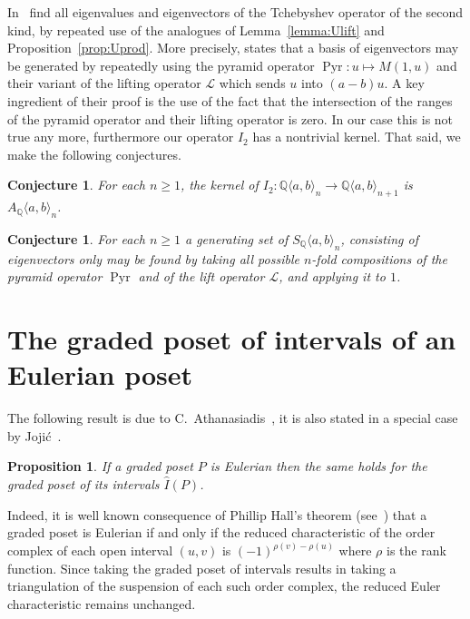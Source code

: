 \documentclass[reqno,12pt]{amsart}
\numberwithin{equation}{section}
\newtheorem{conjecture}[theorem]{Conjecture}
\newtheorem{proposition}[theorem]{Proposition}
\newcommand{\0}{\widehat{0}}
\newcommand{\1}{\widehat{1}}
\newcommand{\2}{\widehat{2}}
\newcommand{\grI}{\widehat{I}}
\newcommand{\II}{I_2}
\newcommand{\lift}{{\mathcal L}}
\newcommand{\Sym}[1]{S_{\mathbb Q}\langle a,b\rangle_{#1}}
\newcommand{\Asym}[1]{A_{\mathbb Q}\langle a,b\rangle_{#1}}
\begin{document}
In~\cite{Ehrenborg-Readdy-Tch} find all eigenvalues and eigenvectors of
the Tchebyshev operator of the second kind, by repeated use of the
analogues of Lemma~\ref{lemma:Ulift} and
Proposition~\ref{prop:Uprod}. More precisely, \cite[Theorem
  10.10]{Ehrenborg-Readdy-Tch} states that a basis of eigenvectors may
be generated by repeatedly using the pyramid operator
$\operatorname{Pyr}: u\mapsto M(1,u)$ and their variant of the lifting
operator $\lift$ which sends $u$ into $(a-b)u$. A key ingredient of
their proof is the use of the fact that the intersection of the ranges
of the pyramid operator and their lifting operator is zero. In our case
this is not true any more, furthermore our operator $\II$ has a
nontrivial kernel. That said, we make the following conjectures.
\begin{conjecture}
For each $n\geq 1$, the kernel of $\II: {\mathbb Q}\langle
a,b\rangle_n\rightarrow {\mathbb Q}\langle a,b\rangle_{n+1}$ is $\Asym{n}$.
\end{conjecture}  

\begin{conjecture}
For each $n\geq 1$ a generating set of $\Sym{n}$, consisting of
eigenvectors only may be found by taking all possible $n$-fold compositions of
the pyramid operator $\operatorname{Pyr}$ and of the lift operator
$\lift$, and applying it to $1$.  
\end{conjecture}  



\section{The graded poset of intervals of an Eulerian poset}
\label{sec:Eulerian}

The following result is due to C.\ Athanasiadis~\cite[Proposition
  2.5]{Athanasiadis}, it is also stated in a special case by
Joji\'{c}~\cite[Remark 10]{Jojic}.   
\begin{proposition}
  \label{prop:Eulerian}
If a graded poset $P$ is Eulerian then the same holds for the graded
poset of its intervals $\grI(P)$.
\end{proposition}  
Indeed, it is well known consequence of Phillip Hall's theorem
(see~\cite[Propositition 3.8.5]{Stanley-EC1}) that a graded poset is
Eulerian if and only if the reduced characteristic of the order complex
of each open interval $(u,v)$ is $(-1)^{\rho(v)-\rho(u)}$ where $\rho$
is the rank function. Since taking the graded poset of intervals results
in taking a triangulation of the suspension of each such order complex,
the reduced Euler characteristic remains unchanged.
\end{document}
